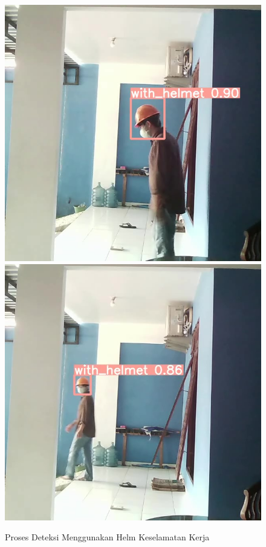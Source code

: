 \begin{figure}[ht]
  \centering
  \includegraphics[scale=0.3]{gambar/video2_Moment.jpg}
  \includegraphics[scale=0.3]{gambar/video2_Moment2.jpg}
  \caption{Proses Deteksi Menggunakan Helm Keselamatan Kerja}
  \label{fig:deteksiwthhelm} 
\end{figure}

